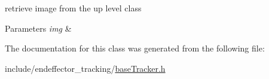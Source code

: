 retrieve image from the up level class 


\begin{DoxyParams}{\-Parameters}
{\em img} & \\
\hline
\end{DoxyParams}


\-The documentation for this class was generated from the following file\-:\begin{DoxyCompactItemize}
\item 
include/endeffector\-\_\-tracking/\hyperlink{baseTracker_8h}{base\-Tracker.\-h}\end{DoxyCompactItemize}

